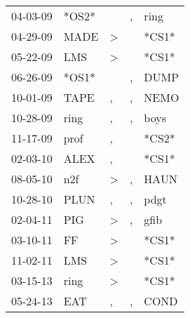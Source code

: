 \begin{supertabular}{p{0.07\textwidth}p{0.06\textwidth}p{0.02\textwidth}p{0.02\textwidth}p{0.06\textwidth}}
          04-03-09\textsuperscript{} &                            *OS2* &                  &             , &           ring\textsuperscript{} \\
          04-29-09\textsuperscript{} &           MADE\textsuperscript{} &     \textgreater &               &                            *CS1* \\
          05-22-09\textsuperscript{} &            LMS\textsuperscript{} &     \textgreater &               &                            *CS1* \\
          06-26-09\textsuperscript{} &                            *OS1* &                  &             , &           DUMP\textsuperscript{} \\
          10-01-09\textsuperscript{} &           TAPE\textsuperscript{} &                , &             , &           NEMO\textsuperscript{} \\
          10-28-09\textsuperscript{} &           ring\textsuperscript{} &                , &             , &           boys\textsuperscript{} \\
          11-17-09\textsuperscript{} &           prof\textsuperscript{} &                , &               &                            *CS2* \\
          02-03-10\textsuperscript{} &           ALEX\textsuperscript{} &                , &               &                            *CS1* \\
          08-05-10\textsuperscript{} &            n2f\textsuperscript{} &     \textgreater &             , &           HAUN\textsuperscript{} \\
          10-28-10\textsuperscript{} &           PLUN\textsuperscript{} &                , &             , &           pdgt\textsuperscript{} \\
          02-04-11\textsuperscript{} &            PIG\textsuperscript{} &     \textgreater &             , &           gfib\textsuperscript{} \\
          03-10-11\textsuperscript{} &             FF\textsuperscript{} &     \textgreater &               &                            *CS1* \\
          11-02-11\textsuperscript{} &            LMS\textsuperscript{} &     \textgreater &               &                            *CS1* \\
          03-15-13\textsuperscript{} &           ring\textsuperscript{} &     \textgreater &               &                            *CS1* \\
          05-24-13\textsuperscript{} &            EAT\textsuperscript{} &                , &             , &           COND\textsuperscript{} \\

\end{supertabular}
